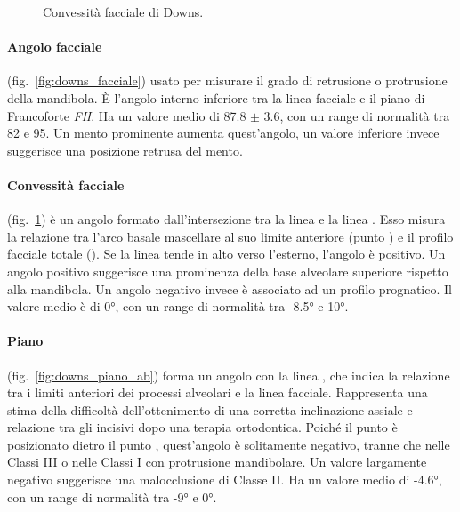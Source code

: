 \begin{figure}[!ht]
\begin{minipage}{.44\textwidth}
 \caption{Convessità facciale di Downs.}
 \label{fig:downs_convessita}
\end{minipage}
\end{figure}

\paragraph{Angolo facciale} (fig.~\ref{fig:downs_facciale}) usato per misurare il grado di retrusione o protrusione della mandibola. È l'angolo interno inferiore tra la linea facciale  e il piano di Francoforte \textit{FH}. Ha un valore medio di 87.8 $\pm$ 3.6, con un range di normalità tra 82 e 95. Un mento prominente aumenta quest'angolo, un valore inferiore invece suggerisce una posizione retrusa del mento.

\paragraph{Convessità facciale} (fig.~\ref{fig:downs_convessita}) è un angolo formato dall'intersezione tra la linea  e la linea . Esso misura la relazione tra l'arco basale mascellare al suo limite anteriore (punto ) e il profilo facciale totale (). Se la linea  tende in alto verso l'esterno, l'angolo è positivo. Un angolo positivo suggerisce una prominenza della base alveolare superiore rispetto alla mandibola. Un angolo negativo invece è associato ad un profilo prognatico. Il valore medio è di 0°, con un range di normalità tra -8.5° e 10°.

\paragraph{Piano } (fig.~\vref{fig:downs_piano_ab}) forma un angolo con la linea , che indica la relazione tra i limiti anteriori dei processi alveolari e la linea facciale. Rappresenta una stima della difficoltà dell'ottenimento di una corretta inclinazione assiale e relazione tra gli incisivi dopo una terapia ortodontica. Poiché il punto  è posizionato dietro il punto , quest'angolo è solitamente negativo, tranne che nelle Classi III o nelle Classi I con protrusione mandibolare. Un valore largamente negativo suggerisce una malocclusione di Classe II. Ha un valore medio di -4.6°, con un range di normalità tra -9° e 0°.

